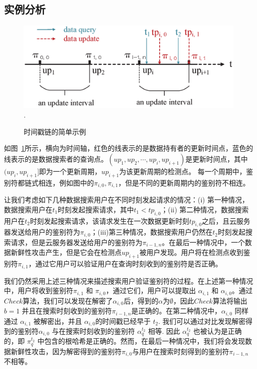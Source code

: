 
\subsection{实例分析}

\begin{figure}[htb]
  \centering
  \includegraphics[width=6 in]{fig/timestamp}
  \DeclareGraphicsExtensions.
  \caption{时间戳链的简单示例}
  \label{fig:timestamp}
\end{figure}

如图~\ref{fig:timestamp}所示，横向为时间轴，红色的线表示的是数据持有者的更新时间点，蓝色的线表示的是数据搜索者的查询点。$(up_1,up_2,\cdots,up_i,up_{i+1})$是更新时间点，其中$(up_i,up_{i+1}]$即为一个更新周期，$up_{i+1}$为该更新周期的检测点。
每一个周期中，鉴别符都链式相连，例如图中的$\pi_{i, 0}, \pi_{i, 1}$，但是不同的更新周期内的鉴别符不相连。

让我们考虑如下几种数据搜索用户在不同时刻发起请求的情况：(i) 第一种情况，数据搜索用户在$t_1$时刻发起搜索请求，其中$t_1 < tp_{i, 0}$；(ii) 第二种情况，数据搜索用户在$t_2$时刻发起搜索请求，该请求发生在一次数据更新时刻$tp_{i, 0}$之后，且云服务器发送给用户的鉴别符为$\pi_{i, 0}$；(iii)第三种情况，数据搜索用户仍然在$t_2$时刻发起搜索请求，但是云服务器发送给用户的鉴别符为$\pi_{i-1, n}$。在最后一种情况中，一个数据新鲜性攻击产生，但是它会在检测点$up_{i+1}$被用户发现。用户将在检测点收到鉴别符$\pi_{i, 1}$，通过它用户可以验证用户在查询时刻收到的鉴别符是否正确。

我们仍然采用上述三种情况来描述搜索用户验证鉴别符的过程。在上述第一种情况中，用户将收到鉴别符$\pi_{i, 1}$ 和 $\pi_{i, 0}$，通过它们，用户可以提取出 $\alpha_{i,1}$ 和 $\alpha_{i,0}$。通过$Check$算法，我们可以发现在解密了$\alpha_{i, 0}$后，得到的$\alpha$为$\emptyset$，因此$Check$算法将输出$b=1$ 并且在搜索时刻收到的鉴别符$\pi_{i-1, n}$是正确的。在第二种情况中，$\alpha_{i, 0}$ 同样通过 $\alpha_{i, 1}$ 被解密出，并且 $\alpha_{i, 0}$的时间戳已经早于 $t_2$. 我们可以通过对比发现解密得到的鉴别符$\alpha_{i, 0}$ 与在搜索时刻收到的鉴别符 $\alpha^{t_2}_q$ 相等. 因此 $\alpha^{t_2}_q$ 也被认为是正确的，即 $\pi^{t_2}_q$ 中包含的根哈希是正确的。然而，在最后一种情况中，我们将会发现数据新鲜性攻击，因为解密得到的鉴别符$\pi_{i, 0}$与用户在搜索时刻得到的鉴别符$\pi_{i-1, n}$不相等。

